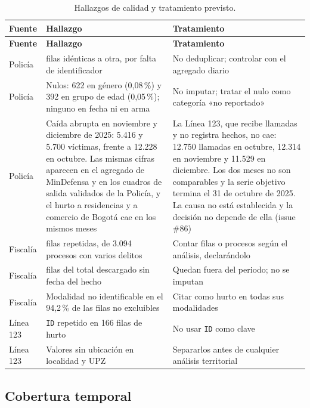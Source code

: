 {\small
\setlength{\tabcolsep}{4pt}
\begin{longtable}{@{}>{\raggedright\arraybackslash}p{2.2cm}>{\raggedright\arraybackslash}p{6.6cm}>{\raggedright\arraybackslash}p{6.5cm}@{}}
\caption{Hallazgos de calidad y tratamiento previsto.}\label{tab:calidad}\\
\toprule
\textbf{Fuente} & \textbf{Hallazgo} & \textbf{Tratamiento} \\
\midrule
\endfirsthead
\toprule
\textbf{Fuente} & \textbf{Hallazgo} & \textbf{Tratamiento} \\
\midrule
\endhead
\bottomrule
\endfoot
Policía & 713.344 filas idénticas a otra, por falta de identificador & No deduplicar; controlar con el agregado diario \\
\addlinespace
Policía & Nulos: 622 en género (0,08\,\%) y 392 en grupo de edad (0,05\,\%); ninguno en fecha ni en arma & No imputar; tratar el nulo como categoría «no reportado» \\
\addlinespace
Policía & Caída abrupta en noviembre y diciembre de 2025: 5.416 y 5.700 víctimas, frente a 12.228 en octubre. Las mismas cifras aparecen en el agregado de MinDefensa y en los cuadros de salida validados de la Policía, y el hurto a residencias y a comercio de Bogotá cae en los mismos meses & La Línea 123, que recibe llamadas y no registra hechos, no cae: 12.750 llamadas en octubre, 12.314 en noviembre y 11.529 en diciembre. Los dos meses no son comparables y la serie objetivo termina el 31 de octubre de 2025. La causa no está establecida y la decisión no depende de ella (issue \#86) \\
\addlinespace
Fiscalía & 3.661 filas repetidas, de 3.094 procesos con varios delitos & Contar filas o procesos según el análisis, declarándolo \\
\addlinespace
Fiscalía & 767 filas del total descargado sin fecha del hecho & Quedan fuera del periodo; no se imputan \\
\addlinespace
Fiscalía & Modalidad no identificable en el 94,2\,\% de las filas no excluibles & Citar como hurto en todas sus modalidades \\
\addlinespace
Línea 123 & \texttt{ID} repetido en 166 filas de hurto & No usar \texttt{ID} como clave \\
\addlinespace
Línea 123 & Valores sin ubicación en localidad y UPZ & Separarlos antes de cualquier análisis territorial \\
\end{longtable}
}

\subsection{Cobertura temporal}

